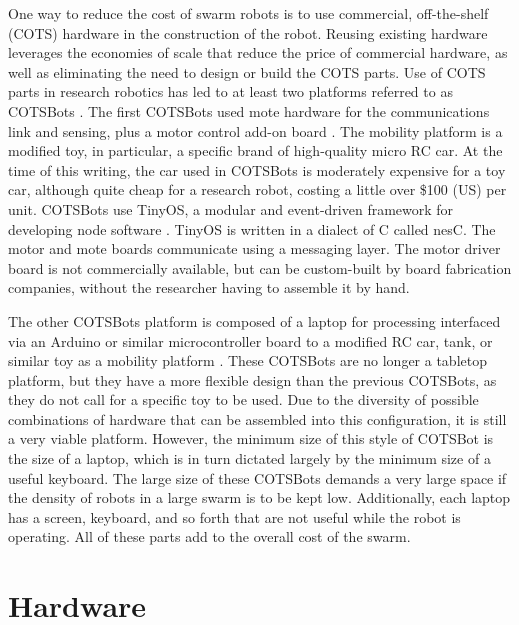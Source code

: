 \documentclass[]{article}
\begin{document}
One way to reduce the cost of swarm robots is to use commercial, off-the-shelf (COTS) hardware in the construction of the robot. 
Reusing existing hardware leverages the economies of scale that reduce the price of commercial hardware, as well as eliminating the need to design or build the COTS parts. 
Use of COTS parts in research robotics has led to at least two platforms referred to as COTSBots \cite{bergbreiter2003cotsbots, soule2011cotsbots}.
The first COTSBots used mote hardware for the communications link and sensing, plus a motor control add-on board \cite{bergbreiter2003cotsbots}. 
The mobility platform is a modified toy, in particular, a specific brand of high-quality micro RC car.
At the time of this writing, the car used in COTSBots is moderately expensive for a toy car, although quite cheap for a research robot, costing a little over \$100 (US) per unit. 
COTSBots use TinyOS, a modular and event-driven framework for developing node software \cite{levis2005tinyos}. 
TinyOS is written in a dialect of C called nesC. The motor and mote boards communicate using a messaging layer. 
The motor driver board is not commercially available, but can be custom-built by board fabrication companies, without the researcher having to assemble it by hand. 

The other COTSBots platform is composed of a laptop for processing interfaced via an Arduino or similar microcontroller board to a modified RC car, tank, or similar toy as a mobility platform \cite{soule2011cotsbots}.
These COTSBots are no longer a tabletop platform, but they have a more flexible design than the previous COTSBots, as they do not call for a specific toy to be used.
Due to the diversity of possible combinations of hardware that can be assembled into this configuration, it is still a very viable platform. 
However, the minimum size of this style of COTSBot is the size of a laptop, which is in turn dictated largely by the minimum size of a useful keyboard. 
The large size of these COTSBots demands a very large space if the density of robots in a large swarm is to be kept low. 
Additionally, each laptop has a screen, keyboard, and so forth that are not useful while the robot is operating. 
All of these parts add to the overall cost of the swarm. 

\section{Hardware}
\end{document}
